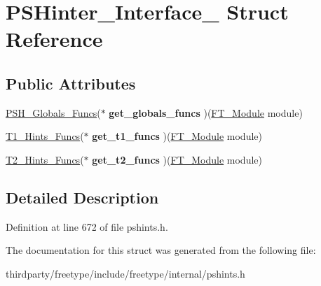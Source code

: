 \hypertarget{struct_p_s_hinter___interface__}{}\section{P\+S\+Hinter\+\_\+\+Interface\+\_\+ Struct Reference}
\label{struct_p_s_hinter___interface__}
\subsection*{Public Attributes}
\begin{DoxyCompactItemize}
\item 
\mbox{\label{struct_p_s_hinter___interface___a76e43921277f51cb28ac5f5ca5d4d849}} 
\hyperlink{struct_p_s_h___globals___funcs_rec__}{P\+S\+H\+\_\+\+Globals\+\_\+\+Funcs}($\ast$ {\bfseries get\+\_\+globals\+\_\+funcs} )(\hyperlink{struct_f_t___module_rec__}{F\+T\+\_\+\+Module} module)
\item 
\mbox{\label{struct_p_s_hinter___interface___ae46a2b9590a09e77c7fa435e5e6d7cb4}} 
\hyperlink{struct_t1___hints___funcs_rec__}{T1\+\_\+\+Hints\+\_\+\+Funcs}($\ast$ {\bfseries get\+\_\+t1\+\_\+funcs} )(\hyperlink{struct_f_t___module_rec__}{F\+T\+\_\+\+Module} module)
\item 
\mbox{\label{struct_p_s_hinter___interface___aff676c6c5e3ca1d266cdd2d4321b21f2}} 
\hyperlink{struct_t2___hints___funcs_rec__}{T2\+\_\+\+Hints\+\_\+\+Funcs}($\ast$ {\bfseries get\+\_\+t2\+\_\+funcs} )(\hyperlink{struct_f_t___module_rec__}{F\+T\+\_\+\+Module} module)
\end{DoxyCompactItemize}


\subsection{Detailed Description}


Definition at line 672 of file pshints.\+h.



The documentation for this struct was generated from the following file\+:\begin{DoxyCompactItemize}
\item 
thirdparty/freetype/include/freetype/internal/pshints.\+h\end{DoxyCompactItemize}
